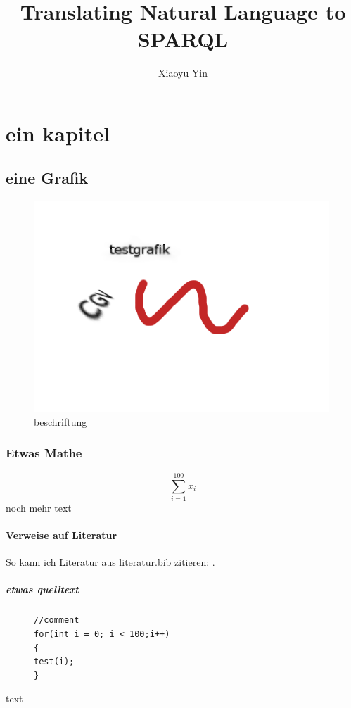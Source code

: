 \documentclass[hyperref,masterofscience]{cgvpub}
\author{Xiaoyu Yin}
\title{Translating Natural Language to SPARQL}
\begin{document}
\chapter{ein kapitel}
\section{eine Grafik}
\begin{figure}[htbp]
	\centering
		\includegraphics{test.png}
	\caption{beschriftung}
	\label{fig:diplominf}
\end{figure}


\subsection{Etwas Mathe}

\[
\sum_{i=1}^{100}x_i
\]
noch mehr text
\subsubsection{Verweise auf Literatur}
So kann ich Literatur aus literatur.bib zitieren: \cite{kochbuch}.

\paragraph{etwas quelltext}


\begin{figure}[htbp]
\begin{lstlisting}[frame=trbl]
//comment
for(int i = 0; i < 100;i++)
{
test(i);
}
\end{lstlisting}
\end{figure}

text

\cite*{}
\end{document}
